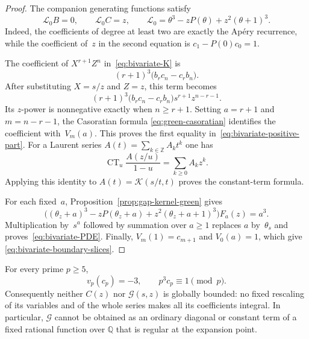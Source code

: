 \begin{proof}
The companion generating functions satisfy
\begin{equation}
 \mathscr L_0B=0,
 \qquad
 \mathscr L_0C=z,
 \qquad
 \mathscr L_0=\theta^3-zP(\theta)+z^2(\theta+1)^3.
 \label{eq:companion-generating-equations}
\end{equation}
Indeed, the coefficients of degree at least two are exactly the Ap\'ery
recurrence, while the coefficient of~$z$ in the second equation is
$c_1-P(0)c_0=1$.

The coefficient of $X^{r+1}Z^n$ in~\eqref{eq:bivariate-K} is
\[
 (r+1)^3\bigl(b_rc_n-c_rb_n\bigr).
\]
After substituting $X=s/z$ and $Z=z$, this term becomes
\[
 (r+1)^3\bigl(b_rc_n-c_rb_n\bigr)
 s^{r+1}z^{n-r-1}.
\]
Its $z$-power is nonnegative exactly when $n\geq r+1$.  Setting
$a=r+1$ and $m=n-r-1$, the Casoratian formula
\eqref{eq:green-casoratian} identifies the coefficient with~$V_m(a)$.
This proves the first equality in~\eqref{eq:bivariate-positive-part}.
For a Laurent series $A(t)=\sum_{k\in\mathbb Z}A_kt^k$ one has
\[
 \operatorname{CT}_u\frac{A(z/u)}{1-u}
 =\sum_{k\geq0}A_kz^k.
\]
Applying this identity to $A(t)=\mathcal K(s/t,t)$ proves the constant-term
formula.

For each fixed~$a$, Proposition~\ref{prop:gap-kernel-green} gives
\[
 \bigl((\theta_z+a)^3-zP(\theta_z+a)
       +z^2(\theta_z+a+1)^3\bigr)F_a(z)=a^3.
\]
Multiplication by~$s^a$ followed by summation over $a\geq1$ replaces
$a$ by~$\theta_s$ and proves~\eqref{eq:bivariate-PDE}.  Finally,
$V_m(1)=c_{m+1}$ and $V_0(a)=1$, which give
\eqref{eq:bivariate-boundary-slices}.
\end{proof}

\begin{proposition}
\label{prop:gap-kernel-denominator-obstruction}
For every prime $p\geq5$,
\begin{equation}
 v_p(c_p)=-3,
 \qquad
 p^3c_p\equiv1\pmod p.
 \label{eq:companion-prime-denominator}
\end{equation}
Consequently neither $C(z)$ nor $\mathcal G(s,z)$ is globally bounded:
no fixed rescaling of its variables and of the whole series makes all its
coefficients integral.  In particular, $\mathcal G$ cannot be obtained as
an ordinary diagonal or constant term of a fixed rational function over
$\mathbb Q$ that is regular at the expansion point.
\end{proposition}

